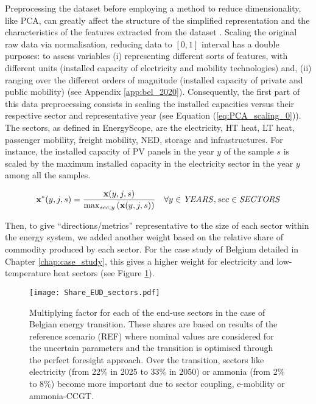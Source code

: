 \noindent
Preprocessing the dataset before employing a method to reduce dimensionality, like \gls{PCA}, can greatly affect the structure of the simplified representation and the characteristics of the features extracted from the dataset \cite{parente2013principal,peerenboom2015dimension}. Scaling the original raw data via normalisation, \ie reducing data to $[0, 1]$ interval has a double purposes: to assess variables (i) representing different sorts of features, with different units (\eg installed capacity of electricity and mobility technologies) and, (ii) ranging over the different orders of magnitude (\eg installed capacity of private and public mobility) (see Appendix \ref{app:bel_2020}).  Consequently, the first part of this data preprocessing consists in scaling the installed capacities versus their respective sector and representative year (see Equation (\ref{eq:PCA_scaling_0})). The sectors, as defined in EnergyScope, are the electricity, \gls{HT} heat, \gls{LT} heat, passenger mobility, freight mobility, \gls{NED}, storage and infrastructures. For instance, the installed capacity of \gls{PV} panels in the year $y$ of the sample $s$ is scaled by the maximum installed capacity in the electricity sector in the year $y$ among all the samples.

\begin{equation}
 \label{eq:PCA_scaling_0}
\textbf{x}^{*}(y,j,s)=\frac{\textbf{x}(y,j,s)}{\mathrm{max}_{sec,y}\left(\textbf{x}(y,j,s)\right)}
 \quad \forall y \in \text{\emph{YEARS}}, sec \in \text{\emph{SECTORS}}
\end{equation}

Then, to give ``directions/metrics'' representative to the size of each sector within the energy system, we added another weight based on the relative share of commodity produced by each sector. For the case study of Belgium detailed in Chapter \ref{chap:case_study}, this gives a higher weight for electricity and low-temperature heat sectors (see Figure \ref{fig:Share_EUD_sectors}). 

\begin{figure}[!htbp]
\centering
\texttt{[image: Share\_EUD\_sectors.pdf]}
\caption{Multiplying factor for each of the end-use sectors in the case of Belgian energy transition. These shares are based on results of the reference scenario (REF) where nominal values are considered for the uncertain parameters and the transition is optimised through the perfect foresight approach. Over the transition, sectors like electricity (\ie from 22\% in 2025 to 33\% in 2050) or ammonia (\ie from 2\% to 8\%) become more important due to sector coupling, \eg e-mobility or ammonia-\gls{CCGT}.}
\label{fig:Share_EUD_sectors}
\end{figure}

